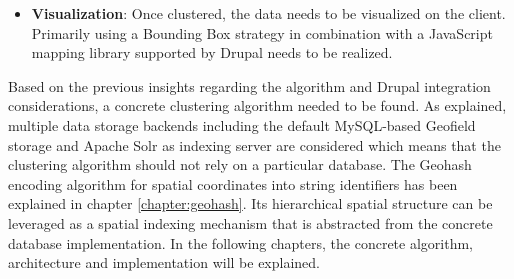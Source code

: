 \begin{itemize}
Two main challenges of integrating a server-side clustering solution with Views have been identified: 1) \textit{allow to inject a custom aggregation implementation}\footnote{\url{http://drupal.org/node/1791796}} and 2) \textit{dealing with geospatially clustered data}\footnote{\url{http://drupal.org/node/1824954}}. The first challenge deals with finding a clean way to integrate a clustering solution into the processing queue of the Views module. The second subsequently deals with challenges that arise when processing and visualizing the clustered data afterwards. As the clustering process changes the data being processed, the implementation needs to take care of involved APIs that work with the changed data. 

Similarly to the previously discussed storage aspect of the Drupal integration, the querying component to account for clustering data in combination with Solr and the Search API.

\item \textbf{Visualization}: Once clustered, the data needs to be visualized on the client. Primarily using a Bounding Box strategy in combination with a JavaScript mapping library supported by Drupal needs to be realized. 

\end{itemize}


Based on the previous insights regarding the algorithm and Drupal integration considerations, a concrete clustering algorithm needed to be found. As explained, multiple data storage backends including the default MySQL-based Geofield storage and Apache Solr as indexing server are considered which means that the clustering algorithm should not rely on a particular database. The Geohash encoding algorithm for spatial coordinates into string identifiers has been explained in chapter \ref{chapter:geohash}. Its hierarchical spatial structure can be leveraged as a spatial indexing mechanism that is abstracted from the concrete database implementation. In the following chapters, the concrete algorithm,  architecture and implementation will be explained.









